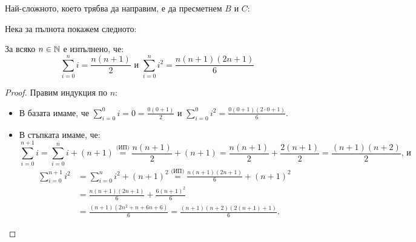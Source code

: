 Най-сложното, което трябва да направим, е да пресметнем $B$ и $C$:


Нека за пълнота покажем следното:
\begin{claim}
  За всяко $n \in \mathbb{N}$ е изпълнено, че:
  \[
    \sum\limits_{i = 0}^n i = \frac{n(n + 1)}{2} \text{ и } \sum\limits_{i = 0}^n i^2 = \frac{n(n + 1)(2n + 1)}{6}
  \]
\end{claim}

\begin{proof}
  Правим индукция по $n$:
  \begin{itemize}
    \item В базата имаме, че $\sum\limits_{i = 0}^0 i = 0 = \frac{0(0 + 1)}{2}$ и $\sum\limits_{i = 0}^0 i^2 = \frac{0(0 + 1)(2 \cdot 0 + 1)}{6}$.
    \item В стъпката имаме, че:
          \[
            \sum\limits_{i = 0}^{n + 1} i = \sum\limits_{i = 0}^{n} i + (n + 1) \stackrel{\text{(ИП)}}{=} \frac{n(n + 1)}{2} + (n + 1) = \frac{n(n + 1)}{2} + \frac{2(n + 1)}{2} = \frac{(n + 1)(n + 2)}{2} \text{, и}
          \]
          \begin{align*}
            \sum\limits_{i = 0}^{n + 1} i^2 & = \sum\limits_{i = 0}^{n} i^2 + (n + 1)^2 \stackrel{\text{(ИП)}}{=} \frac{n(n + 1)(2n + 1)}{6} + (n + 1)^2 \\
                                            & = \frac{n(n + 1)(2n + 1)}{6} + \frac{6(n + 1)^2}{6}                                                        \\
                                            & = \frac{(n + 1)(2n^2 + n + 6n + 6)}{6} = \frac{(n + 1)(n + 2)(2(n + 1) + 1)}{6}.
          \end{align*}
  \end{itemize}
\end{proof}